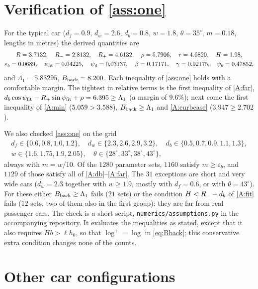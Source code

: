 \section{Verification of \texorpdfstring{\cref{ass:one}}{Assumption}}\label{app:assumptions}

For the typical car ($d_f=0.9$, $d_w=2.6$, $d_b=0.8$, $w=1.8$, $\theta=35^\circ$, $m=0.18$, lengths in metres) the derived quantities are
\[
\begin{gathered}
  R=3.7132,\quad R_{-}=2.8132,\quad R_{+}=4.6132,\quad \rho=5.7906,\quad r=4.6820,\quad H=1.98,\\
  \varepsilon_b=0.0689,\quad \psi_{\rm fit}=0.04225,\quad \psi_d=0.03137,\quad \beta=0.17171,\quad \gamma=0.92175,\quad \psi_b=0.47852,
\end{gathered}
\]
and $\Lambda_1=5.83295$, $B_{\rm back}=8.200$.
Each inequality of \cref{ass:one} holds with a comfortable margin.
The tightest in relative terms is the first inequality of \ref{A:far}, $d_b\cos\psi_{\rm fit}-R_{+}\sin\psi_{\rm fit}+\rho=6.395\ge\Lambda_1$ (a margin of $9.6\%$); next come the first inequality of \ref{A:min} ($5.059>3.588$), $B_{\rm back}\ge\Lambda_1$ and \ref{A:curbcase} ($3.947\ge2.702$).

We also checked \cref{ass:one} on the grid
\[
\begin{gathered}
  d_f\in\{0.6,0.8,1.0,1.2\},\quad d_w\in\{2.3,2.6,2.9,3.2\},\quad d_b\in\{0.5,0.7,0.9,1.1,1.3\},\\
  w\in\{1.6,1.75,1.9,2.05\},\quad \theta\in\{28^\circ,33^\circ,38^\circ,43^\circ\},
\end{gathered}
\]
always with $m=w/10$.
Of the $1280$ parameter sets, $1160$ satisfy $m\ge\varepsilon_b$, and $1129$ of those satisfy all of \ref{A:db}--\ref{A:far}.
The $31$ exceptions are short and very wide cars ($d_w=2.3$ together with $w\ge1.9$, mostly with $d_f=0.6$, or with $\theta=43^\circ$).
For these either $B_{\rm back}\ge\Lambda_1$ fails ($21$ sets) or the condition $H<R_{-}+d_b$ of \ref{A:fit} fails ($12$ sets, two of them also in the first group); they are far from real passenger cars.
The check is a short script, \texttt{numerics/assumptions.py} in the accompanying repository.
It evaluates the inequalities as stated, except that it also requires $Hb>\ell h_0$, so that $\log^+=\log$ in \eqref{eq:Bback}; this conservative extra condition changes none of the counts.

\section{Other car configurations}\label{app:cars}

